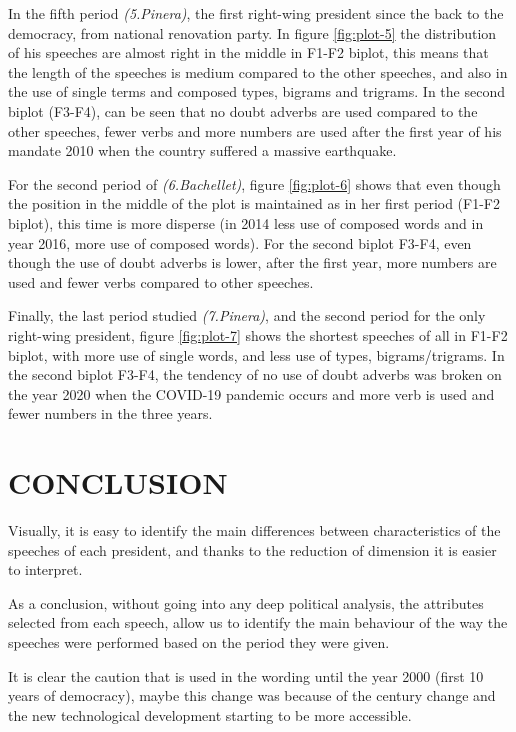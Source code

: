 \documentclass[
  12pt,
]{article}
\begin{document}
In the fifth period \emph{(5.Pinera)}, the first right-wing president since the back to the democracy, from national renovation party. In figure \ref{fig:plot-5} the distribution of his speeches are almost right in the middle in F1-F2 biplot, this means that the length of the speeches is medium compared to the other speeches, and also in the use of single terms and composed types, bigrams and trigrams. In the second biplot (F3-F4), can be seen that no doubt adverbs are used compared to the other speeches, fewer verbs and more numbers are used after the first year of his mandate 2010 when the country suffered a massive earthquake.

For the second period of \emph{(6.Bachellet)}, figure \ref{fig:plot-6} shows that even though the position in the middle of the plot is maintained as in her first period (F1-F2 biplot), this time is more disperse (in 2014 less use of composed words and in year 2016, more use of composed words). For the second biplot F3-F4, even though the use of doubt adverbs is lower, after the first year, more numbers are used and fewer verbs compared to other speeches.

Finally, the last period studied \emph{(7.Pinera)}, and the second period for the only right-wing president, figure \ref{fig:plot-7} shows the shortest speeches of all in F1-F2 biplot, with more use of single words, and less use of types, bigrams/trigrams. In the second biplot F3-F4, the tendency of no use of doubt adverbs was broken on the year 2020 when the COVID-19 pandemic occurs and more verb is used and fewer numbers in the three years.

\hypertarget{conclusion}{%
\section{CONCLUSION}\label{conclusion}}

Visually, it is easy to identify the main differences between characteristics of the speeches of each president, and thanks to the reduction of dimension it is easier to interpret.

As a conclusion, without going into any deep political analysis, the attributes selected from each speech, allow us to identify the main behaviour of the way the speeches were performed based on the period they were given.

It is clear the caution that is used in the wording until the year 2000 (first 10 years of democracy), maybe this change was because of the century change and the new technological development starting to be more accessible.
\end{document}
